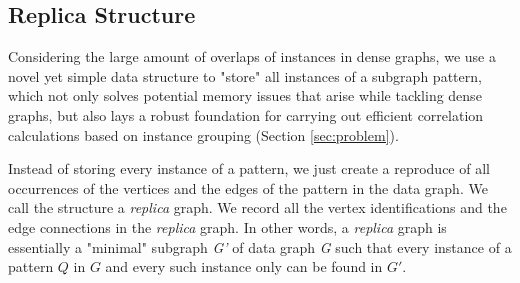 \subsection{Replica Structure}
\label{subsubsec:replica-ds}
 Considering the large amount of overlaps of instances in dense graphs,
 we use a novel yet simple data structure to "store" all instances of a subgraph
 pattern, which not only solves potential memory issues that arise while
 tackling dense graphs, but also lays a robust foundation for carrying out
 efficient correlation calculations based on instance grouping (Section \ref{sec:problem}).
\par Instead of storing every instance of a pattern, we just create a reproduce
 of all occurrences of the vertices and the edges of the pattern in the data graph. We call the
 structure a \textit{replica} graph. We record all the vertex identifications
 and the edge connections in the \textit{replica} graph. In other words, a \textit{replica} graph is essentially a
 "minimal" subgraph \textit{G'} of data graph \textit{G} such that every
 instance of a pattern $Q$ in $G$ and every such instance only can be found in
 $G'$.
 
